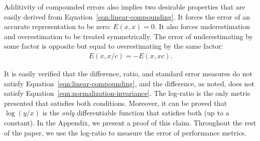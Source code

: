 \documentclass[conference]{IEEEtran}
\begin{document}
Additivity of compounded errors also implies two desirable properties that are easily derived from Equation~\ref{eqn:linear-compounding}. It forces the error of an accurate representation to be zero: $E(x,x) = 0$. It also forces underestimation and overestimation to be treated symmetrically. The error of underestimating by some factor is opposite but equal to overestimating by the same factor:
\begin{align}
E(x,x/c) = - E(x,xc).
\end{align}

It is easily verified that the difference, ratio, and standard error measures do not satisfy Equation~\ref{eqn:linear-compounding}, and the difference, as noted, does not satisfy Equation~\ref{eqn:normalization-invariance}. The log-ratio is the only metric presented that satisfies both conditions. Moreover, it can be proved that $\log(y/x)$ is the \textit{only} differentiable function that satisfies both (up to a constant). In the Appendix, we present a proof of this claim. Throughout the rest of the paper, we use the log-ratio to measure the error of performance metrics.

\end{document}
